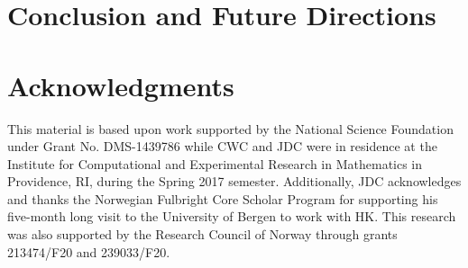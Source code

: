 \documentclass{JFM_Style/jfm}
\begin{document}
\section{Conclusion and Future Directions}

\section{Acknowledgments}
This material is based upon work supported by the National Science Foundation under Grant No. DMS-1439786 while CWC and JDC were in residence at the Institute for Computational and Experimental Research in Mathematics in Providence, RI, during the Spring 2017 semester.  Additionally, JDC acknowledges and thanks the Norwegian Fulbright Core Scholar Program for supporting his five-month long visit to the University of Bergen to work with HK. This research was also supported by
the Research Council of Norway through grants 213474/F20 and 239033/F20.



\end{document}
